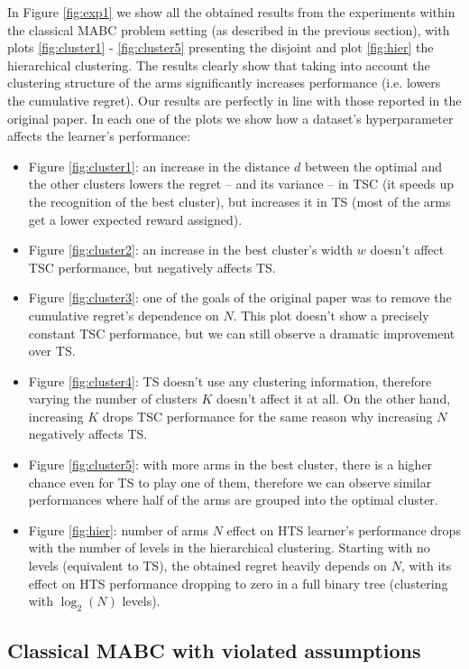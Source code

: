 In Figure \ref{fig:exp1} we show all the obtained results from the experiments within the classical MABC problem setting (as described in the previous section), with plots \ref{fig:cluster1} - \ref{fig:cluster5} presenting the disjoint and plot \ref{fig:hier} the hierarchical clustering. The results clearly show that taking into account the clustering structure of the arms significantly increases performance (i.e. lowers the cumulative regret). Our results are perfectly in line with those reported in the original paper. In each one of the plots we show how a dataset's hyperparameter affects the learner's performance:

\begin{itemize}
  \item Figure \ref{fig:cluster1}: an increase in the distance $d$ between the optimal and the other clusters lowers the regret -- and its variance -- in TSC (it speeds up the recognition of the best cluster), but increases it in TS (most of the arms get a lower expected reward assigned).
  \item Figure \ref{fig:cluster2}: an increase in the best cluster's width $w$ doesn't affect TSC performance, but negatively affects TS.
  \item Figure \ref{fig:cluster3}: one of the goals of the original paper was to remove the cumulative regret's dependence on $N$. This plot doesn't show a precisely constant TSC performance, but we can still observe a dramatic improvement over TS.
  \item Figure \ref{fig:cluster4}: TS doesn't use any clustering information, therefore varying the number of clusters $K$ doesn't affect it at all. On the other hand, increasing $K$ drops TSC performance for the same reason why increasing $N$ negatively affects TS.
  \item Figure \ref{fig:cluster5}: with more arms in the best cluster, there is a higher chance even for TS to play one of them, therefore we can observe similar performances where half of the arms are grouped into the optimal cluster.
  \item Figure \ref{fig:hier}: number of arms $N$ effect on HTS learner's performance drops with the number of levels in the hierarchical clustering. Starting with no levels (equivalent to TS), the obtained regret heavily depends on $N$, with its effect on HTS performance dropping to zero in a full binary tree (clustering with $\log_2(N)$ levels).
\end{itemize}

\subsection{Classical MABC with violated assumptions}

